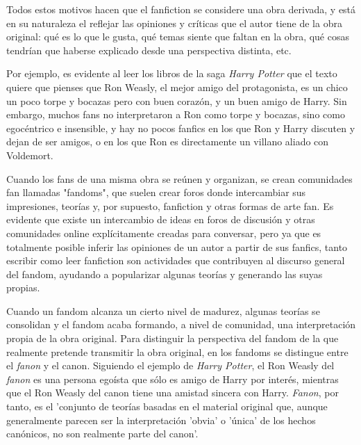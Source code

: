 \documentclass{pre-tfg}
\begin{document}
Todos estos motivos hacen que el fanfiction se considere una obra derivada\cite{woosh_1998}, y está en su naturaleza el reflejar las opiniones y críticas que el autor tiene de la obra original: qué es lo que le gusta, qué temas siente que faltan en la obra, qué cosas tendrían que haberse explicado desde una perspectiva distinta, etc.

Por ejemplo, es evidente al leer los libros de la saga \textit{Harry Potter} que el texto quiere que pienses que Ron Weasly, el mejor amigo del protagonista, es un chico un poco torpe y bocazas pero con buen corazón, y un buen amigo de Harry. Sin embargo, muchos fans no interpretaron a Ron como torpe y bocazas, sino como egocéntrico e insensible, y hay no pocos fanfics en los que Ron y Harry discuten y dejan de ser amigos, o en los que Ron es directamente un villano aliado con Voldemort.

Cuando los fans de una misma obra se reúnen y organizan, se crean comunidades fan llamadas "fandoms", que suelen crear foros donde intercambiar sus impresiones, teorías y, por supuesto, fanfiction y otras formas de arte fan. Es evidente que existe un intercambio de ideas en foros de discusión y otras comunidades online explícitamente creadas para conversar, pero ya que es totalmente posible inferir las opiniones de un autor a partir de sus fanfics, tanto escribir como leer fanfiction son actividades que contribuyen al discurso general del fandom, ayudando a popularizar algunas teorías y generando las suyas propias.

Cuando un fandom alcanza un cierto nivel de madurez, algunas teorías se consolidan y el fandom acaba formando, a nivel de comunidad, una interpretación propia de la obra original. Para distinguir la perspectiva del fandom de la que realmente pretende transmitir la obra original, en los fandoms se distingue entre el \textit{fanon} y el canon. Siguiendo el ejemplo de \textit{Harry Potter}, el Ron Weasly del \textit{fanon} es una persona egoísta que sólo es amigo de Harry por interés, mientras que el Ron Weasly del canon tiene una amistad sincera con Harry. \textit{Fanon}, por tanto, es el 'conjunto de teorías basadas en el material original que, aunque generalmente parecen ser la interpretación 'obvia' o 'única' de los hechos canónicos, no son realmente parte del canon'\cite{uncanny_2017}.


\end{document}
